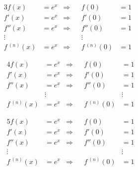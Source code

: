 \documentclass[oneside]{book}
\begin{document}
\begin{align*}
3f(x)&=e^x & \Rightarrow && f(0)&=1 \\
f'(x)&=e^x & \Rightarrow && f'(0)&=1 \\
f''(x)&=e^x & \Rightarrow && f''(0)&=1 \\
\vdots &&&& \vdots && \\
f\,^{(n)}(x)&=e^x & \Rightarrow && f\,^{(n)}(0)&=1
\end{align*}

\begin{align*}
4f(x)&=e^x & \Rightarrow && f(0)&=1 \\
f'(x)&=e^x & \Rightarrow && f'(0)&=1 \\
f''(x)&=e^x & \Rightarrow && f''(0)&=1 \\
& \vdots &&&& \vdots \\
f\,^{(n)}(x)&=e^x & \Rightarrow && f\,^{(n)}(0)&=1
\end{align*}

\begin{align*}
5f(x)&=e^x & \Rightarrow && f(0)&=1 \\
f'(x)&=e^x & \Rightarrow && f'(0)&=1 \\
f''(x)&=e^x & \Rightarrow && f''(0)&=1 \\
\vdots &&&&& \vdots \\
f\,^{(n)}(x)&=e^x & \Rightarrow && f\,^{(n)}(0)&=1
\end{align*}

\end{document}
